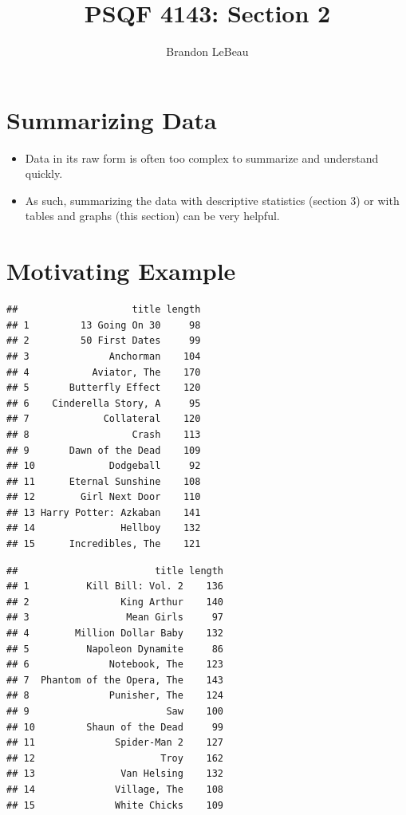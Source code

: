 \documentclass[12pt]{article}
\title{PSQF 4143: Section 2}
\author{Brandon LeBeau}
\date{}
\begin{document}
\maketitle

\section{Summarizing Data}\label{summarizing-data}

\begin{itemize}
\itemsep1pt\parskip0pt
\item
  Data in its raw form is often too complex to summarize and understand
  quickly.
\item
  As such, summarizing the data with descriptive statistics (section 3)
  or with tables and graphs (this section) can be very helpful.
\end{itemize}

\section{Motivating Example}\label{motivating-example}

\begin{multicols}{2}
\begin{verbatim}
##                    title length
## 1         13 Going On 30     98
## 2         50 First Dates     99
## 3              Anchorman    104
## 4           Aviator, The    170
## 5       Butterfly Effect    120
## 6    Cinderella Story, A     95
## 7             Collateral    120
## 8                  Crash    113
## 9       Dawn of the Dead    109
## 10             Dodgeball     92
## 11      Eternal Sunshine    108
## 12        Girl Next Door    110
## 13 Harry Potter: Azkaban    141
## 14               Hellboy    132
## 15      Incredibles, The    121
\end{verbatim}
\columnbreak
\begin{verbatim}
##                        title length
## 1          Kill Bill: Vol. 2    136
## 2                King Arthur    140
## 3                 Mean Girls     97
## 4        Million Dollar Baby    132
## 5          Napoleon Dynamite     86
## 6              Notebook, The    123
## 7  Phantom of the Opera, The    143
## 8              Punisher, The    124
## 9                        Saw    100
## 10         Shaun of the Dead     99
## 11              Spider-Man 2    127
## 12                      Troy    162
## 13               Van Helsing    132
## 14              Village, The    108
## 15              White Chicks    109
\end{verbatim}
\end{multicols}
\end{document}
